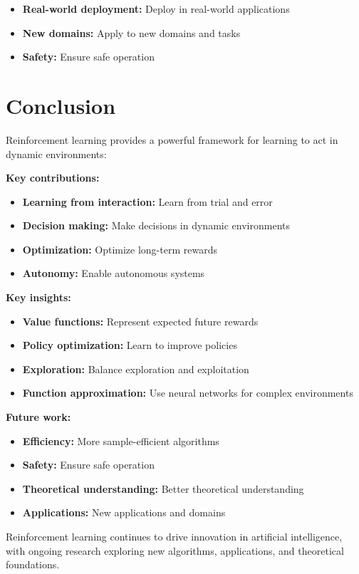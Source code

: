 \begin{itemize}
    \item \textbf{Real-world deployment:} Deploy in real-world applications
    \item \textbf{New domains:} Apply to new domains and tasks
    \item \textbf{Safety:} Ensure safe operation
\end{itemize}

\section{Conclusion}

Reinforcement learning provides a powerful framework for learning to act in dynamic environments:

\textbf{Key contributions:}
\begin{itemize}
    \item \textbf{Learning from interaction:} Learn from trial and error
    \item \textbf{Decision making:} Make decisions in dynamic environments
    \item \textbf{Optimization:} Optimize long-term rewards
    \item \textbf{Autonomy:} Enable autonomous systems
\end{itemize}

\textbf{Key insights:}
\begin{itemize}
    \item \textbf{Value functions:} Represent expected future rewards
    \item \textbf{Policy optimization:} Learn to improve policies
    \item \textbf{Exploration:} Balance exploration and exploitation
    \item \textbf{Function approximation:} Use neural networks for complex environments
\end{itemize}

\textbf{Future work:}
\begin{itemize}
    \item \textbf{Efficiency:} More sample-efficient algorithms
    \item \textbf{Safety:} Ensure safe operation
    \item \textbf{Theoretical understanding:} Better theoretical understanding
    \item \textbf{Applications:} New applications and domains
\end{itemize}

Reinforcement learning continues to drive innovation in artificial intelligence, with ongoing research exploring new algorithms, applications, and theoretical foundations.
